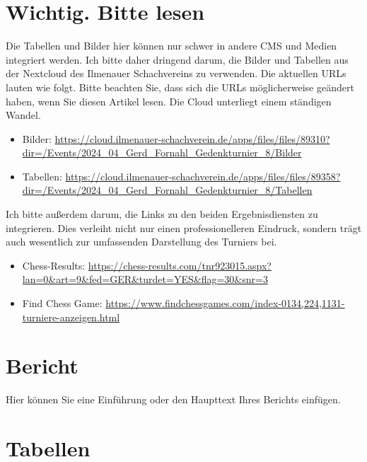 \documentclass[a4paper,ngerman]{tui-algo-seminar}
\title{\inhalt}
\author{Erik Skopp}
\newcommand{\inhalt}{8. Gerd Fornahl Turnier 2024}
\begin{document}
\maketitle
\thispagestyle{plain} %
\begin{abstract}
Bericht: \inhalt.\\
Das 
\end{abstract}

\tableofcontents 
\clearpage
\section{Wichtig. Bitte lesen}

Die Tabellen und Bilder hier können nur schwer in andere CMS und Medien integriert werden. Ich bitte daher dringend darum, die Bilder und Tabellen aus der Nextcloud des Ilmenauer Schachvereins zu verwenden. Die aktuellen URLs lauten wie folgt. Bitte beachten Sie, dass sich die URLs möglicherweise geändert haben, wenn Sie diesen Artikel lesen. Die Cloud unterliegt einem ständigen Wandel.
\begin{itemize}
    \item Bilder: \url{https://cloud.ilmenauer-schachverein.de/apps/files/files/89310?dir=/Events/2024_04_Gerd_Fornahl_Gedenkturnier_8/Bilder}
    \item Tabellen: \url{https://cloud.ilmenauer-schachverein.de/apps/files/files/89358?dir=/Events/2024_04_Gerd_Fornahl_Gedenkturnier_8/Tabellen}
\end{itemize}

Ich bitte außerdem darum, die Links zu den beiden Ergebnisdiensten zu integrieren. Dies verleiht nicht nur einen professionelleren Eindruck, sondern trägt auch wesentlich zur umfassenden Darstellung des Turniers bei.

\begin{itemize}
    \item Chess-Results: \url{https://chess-results.com/tnr923015.aspx?lan=0&art=9&fed=GER&turdet=YES&flag=30&snr=3}
     \item Find Chess Game: \url{https://www.findchessgames.com/index-0134,224,1131-turniere-anzeigen.html}
\end{itemize}
\section{Bericht}
Hier können Sie eine Einführung oder den Haupttext Ihres Berichts einfügen.

\clearpage
\section{Tabellen}
\end{document}
